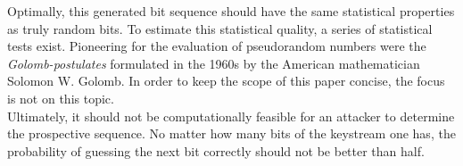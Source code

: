 Optimally, this generated bit sequence should have the same statistical properties as truly random bits. To estimate this statistical quality, a series of statistical tests exist. Pioneering for the evaluation of pseudorandom numbers were the \textit{Golomb-postulates} formulated in the 1960s by the American mathematician Solomon W. Golomb. \cite[p. 43]{Golomb.1967} In order to keep the scope of this paper concise, the focus is not on this topic.\\

Ultimately, it should not be computationally feasible for an attacker to determine the prospective  sequence. No matter how many bits of the keystream one has, the probability of guessing the next bit correctly should not be better than half.
